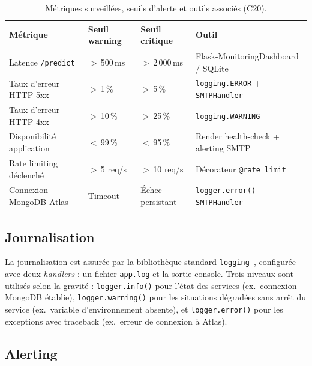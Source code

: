 \documentclass[french, a4paper, 12pt]{article}
\begin{document}
\renewcommand{\arraystretch}{1.25}
\begin{table}[htbp]
    \centering
    \small
    \begin{tabularx}{\textwidth}{%
        >{\raggedright}p{3.5cm}
        >{\centering\arraybackslash}p{2.2cm}
        >{\centering\arraybackslash}p{2.2cm}
        >{\raggedright\arraybackslash}X}
        \toprule
        \textbf{Métrique} & \textbf{Seuil warning} & \textbf{Seuil critique} & \textbf{Outil} \\
        \midrule
        Latence \texttt{/predict} & $>$\,500\,ms & $>$\,2\,000\,ms & Flask-MonitoringDashboard / SQLite \\
        Taux d'erreur HTTP 5xx    & $>$\,1\,\%    & $>$\,5\,\%       & \texttt{logging.ERROR} + \texttt{SMTPHandler} \\
        Taux d'erreur HTTP 4xx    & $>$\,10\,\%   & $>$\,25\,\%      & \texttt{logging.WARNING} \\
        Disponibilité application & $<$\,99\,\%   & $<$\,95\,\%      & Render health-check + alerting SMTP \\
        Rate limiting déclenché   & $>$\,5 req/s  & $>$\,10 req/s    & Décorateur \texttt{@rate\_limit} \\
        Connexion MongoDB Atlas   & Timeout       & Échec persistant & \texttt{logger.error()} + \texttt{SMTPHandler} \\
        \bottomrule
    \end{tabularx}
    \caption{Métriques surveillées, seuils d'alerte et outils associés (C20).}
    \label{tab:metriques}
\end{table}

\subsection{Journalisation}

La journalisation est assurée par la bibliothèque standard \texttt{logging}~\cite{PythonLogging},
configurée avec deux \textit{handlers} : un fichier \texttt{app.log} et la
sortie console. Trois niveaux sont utilisés selon la gravité :
\texttt{logger.info()} pour l'état des services (ex.\ connexion MongoDB établie),
\texttt{logger.warning()} pour les situations dégradées sans arrêt du service
(ex.\ variable d'environnement absente), et \texttt{logger.error()} pour les
exceptions avec traceback (ex.\ erreur de connexion à Atlas).

\subsection{Alerting}
\end{document}
